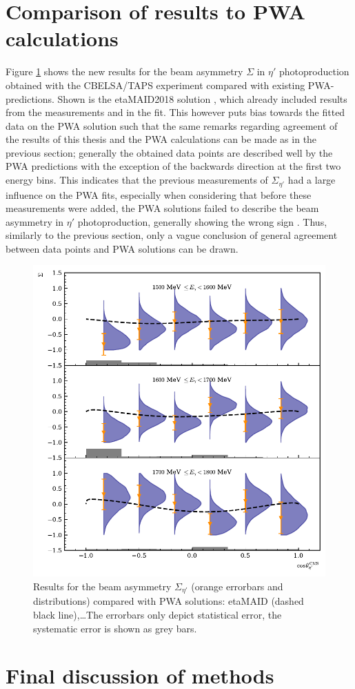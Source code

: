 \section{Comparison of results to PWA calculations}
Figure \ref{fig:pwa} shows the new results for the beam asymmetry $\Sigma$ in $\eta'$ photoproduction obtained with the CBELSA/TAPS experiment compared with existing PWA-predictions. Shown is the etaMAID2018 solution \cite{etaMAID}, which already included results from the measurements \cite{collins} and \cite{thresh} in the fit. This however puts bias towards  the fitted data on the PWA solution such that the same remarks regarding agreement of the results of this thesis and the PWA calculations can be made as in the previous section; generally the obtained data points are described well by the PWA predictions with the exception of the backwards direction at the first two energy bins. This indicates that the previous measurements of $\Sigma_{\eta'}$ had a large influence on the PWA fits, especially when considering that before these measurements were added, the PWA solutions failed to describe the beam asymmetry in $\eta'$ photoproduction, generally showing the wrong sign \cite{collins}. Thus, similarly to the previous section, only a vague conclusion of general agreement between data points and PWA solutions can be drawn.

\begin{figure}[htbp]
\centering
\includegraphics[width=\linewidth]{../bayes/etap_event_based_fit/plots/sigma_etap_pwa.pdf}
\caption{Results for the beam asymmetry $\Sigma_{\eta'}$ (orange errorbars and distributions) compared with PWA solutions:  etaMAID \cite{etaMAID}(dashed black line),\dots The errorbars only depict statistical error, the systematic error is shown as grey bars.}
\label{fig:pwa}
\end{figure}
\section{Final discussion of methods}